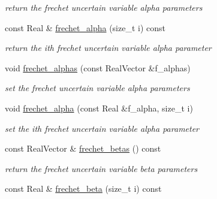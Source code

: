 \begin{DoxyCompactItemize}
\begin{DoxyCompactList}\small\item\em return the frechet uncertain variable alpha parameters \end{DoxyCompactList}\item 
const Real \& \hyperlink{classPecos_1_1AleatoryDistParams_ad55c5821d3f9d723d52455f18e5ceea3}{frechet\+\_\+alpha} (size\+\_\+t i) const \label{classPecos_1_1AleatoryDistParams_ad55c5821d3f9d723d52455f18e5ceea3}

\begin{DoxyCompactList}\small\item\em return the ith frechet uncertain variable alpha parameter \end{DoxyCompactList}\item 
void \hyperlink{classPecos_1_1AleatoryDistParams_a410902168dcdf29cca51238d6b4f2bd1}{frechet\+\_\+alphas} (const Real\+Vector \&f\+\_\+alphas)\label{classPecos_1_1AleatoryDistParams_a410902168dcdf29cca51238d6b4f2bd1}

\begin{DoxyCompactList}\small\item\em set the frechet uncertain variable alpha parameters \end{DoxyCompactList}\item 
void \hyperlink{classPecos_1_1AleatoryDistParams_a9ba94fbebe94dbd28cc13fbe1c1484fe}{frechet\+\_\+alpha} (const Real \&f\+\_\+alpha, size\+\_\+t i)\label{classPecos_1_1AleatoryDistParams_a9ba94fbebe94dbd28cc13fbe1c1484fe}

\begin{DoxyCompactList}\small\item\em set the ith frechet uncertain variable alpha parameter \end{DoxyCompactList}\item 
const Real\+Vector \& \hyperlink{classPecos_1_1AleatoryDistParams_adf681262de06df304efe48616ea05cbd}{frechet\+\_\+betas} () const \label{classPecos_1_1AleatoryDistParams_adf681262de06df304efe48616ea05cbd}

\begin{DoxyCompactList}\small\item\em return the frechet uncertain variable beta parameters \end{DoxyCompactList}\item 
const Real \& \hyperlink{classPecos_1_1AleatoryDistParams_ae4e0c31472b99b8d47fb37ae7e3bb352}{frechet\+\_\+beta} (size\+\_\+t i) const \label{classPecos_1_1AleatoryDistParams_ae4e0c31472b99b8d47fb37ae7e3bb352}


\end{DoxyCompactItemize}
